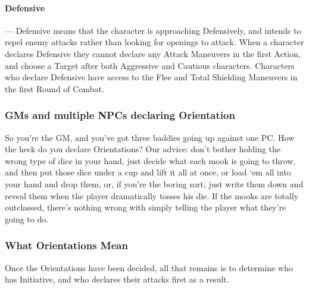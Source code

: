\documentclass[oneside,11pt,english]{book}
\begin{document}
\paragraph{\label{par:Defensive}Defensive}---\quad
Defensive means that the character is approaching Defensively, and intends to repel enemy
attacks rather than looking for openings to attack. When a character declares Defensive they
cannot declare any Attack Maneuvers in the first Action, and choose a Target after both
Aggressive and Cautious characters. Characters who declare Defensive have access to the Flee
and Total Shielding Maneuvers in the first Round of Combat.
\subsubsection*{GMs and multiple NPCs declaring Orientation}
So you’re the GM, and you’ve got three baddies going up against one PC. How the heck do you declare
Orientations?
Our advice: don’t bother holding the wrong type of dice in your hand, just decide what each mook is
going to throw, and then put those dice under a cup and lift it all at once, or load ‘em all into your hand
and drop them, or, if you’re the boring sort, just write them down and reveal them when the player
dramatically tosses his die. If the mooks are totally outclassed, there’s nothing wrong with simply telling
the player what they’re going to do.
\subsubsection*{What Orientations Mean}
Once the Orientations have been decided, all that remains is to determine who has Initiative, and who
declares their attacks first as a result.
\end{document}

